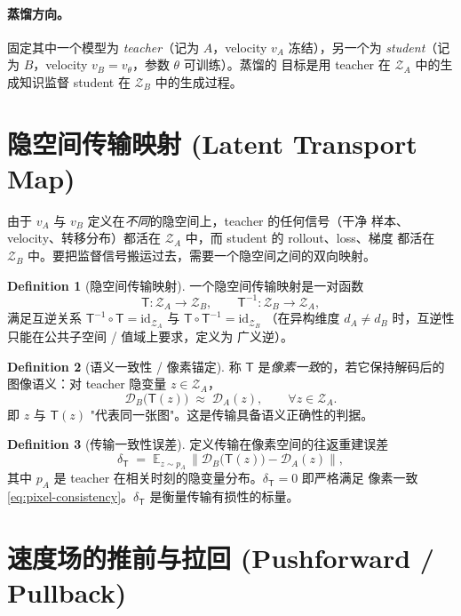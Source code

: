 \documentclass[11pt,a4paper]{article}
\newcommand{\E}{\mathbb{E}}
\newcommand{\Za}{\mathcal{Z}_{A}}
\newcommand{\Zb}{\mathcal{Z}_{B}}
\newcommand{\Dec}{\mathcal{D}}
\newcommand{\Tmap}{\mathsf{T}}
\newcommand{\Tinv}{\mathsf{T}^{-1}}
\newcommand{\norm}[1]{\left\lVert #1 \right\rVert}
\theoremstyle{definition}
\newtheorem{definition}{Definition}
\begin{document}
\paragraph{蒸馏方向。}
固定其中一个模型为 \emph{teacher}（记为 $A$，velocity $v_A$ 冻结），另一个为
\emph{student}（记为 $B$，velocity $v_B=v_\theta$，参数 $\theta$ 可训练）。蒸馏的
目标是用 teacher 在 $\Za$ 中的生成知识监督 student 在 $\Zb$ 中的生成过程。

\section{隐空间传输映射 (Latent Transport Map)}
\label{sec:transport}

由于 $v_A$ 与 $v_B$ 定义在\emph{不同}的隐空间上，teacher 的任何信号（干净
样本、velocity、转移分布）都活在 $\Za$ 中，而 student 的 rollout、loss、梯度
都活在 $\Zb$ 中。要把监督信号搬运过去，需要一个隐空间之间的双向映射。

\begin{definition}[隐空间传输映射]
\label{def:transport}
一个隐空间传输映射是一对函数
\[
\Tmap:\Za\to\Zb,\qquad \Tinv:\Zb\to\Za,
\]
满足互逆关系 $\Tinv\circ\Tmap=\mathrm{id}_{\Za}$ 与 $\Tmap\circ\Tinv=\mathrm{id}_{\Zb}$
（在异构维度 $d_A\neq d_B$ 时，互逆性只能在公共子空间 / 值域上要求，定义为
广义逆）。
\end{definition}

\begin{definition}[语义一致性 / 像素锚定]
\label{def:consistency}
称 $\Tmap$ 是\emph{像素一致}的，若它保持解码后的图像语义：对 teacher 隐变量
$z\in\Za$，
\begin{equation}
\Dec_B\big(\Tmap(z)\big)\;\approx\;\Dec_A(z),
\qquad \forall z\in\Za.
\label{eq:pixel-consistency}
\end{equation}
即 $z$ 与 $\Tmap(z)$ "代表同一张图"。这是传输具备语义正确性的判据。
\end{definition}

\begin{definition}[传输一致性误差]
\label{def:delta}
定义传输在像素空间的往返重建误差
\begin{equation}
\delta_{\Tmap}
\;=\;
\E_{z\sim p_A}\,\norm{\Dec_B\big(\Tmap(z)\big)-\Dec_A(z)},
\label{eq:delta}
\end{equation}
其中 $p_A$ 是 teacher 在相关时刻的隐变量分布。$\delta_{\Tmap}=0$ 即严格满足
像素一致 \eqref{eq:pixel-consistency}。$\delta_{\Tmap}$ 是衡量传输有损性的标量。
\end{definition}

\section{速度场的推前与拉回 (Pushforward / Pullback)}
\label{sec:pushforward}
\end{document}
